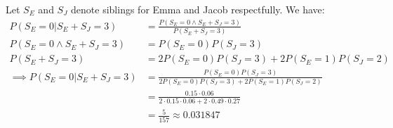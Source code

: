 \documentclass[10pt, a4paper, english]{../Template/NTNUoving}
\begin{document}
\begin{oppgave}
    \begin{punkt}
        Let $S_E$ and $S_J$ denote siblings for Emma and Jacob respectfully. We have:
        \begin{align*}
            P(S_E = 0 | S_E + S_J = 3)
            &= \frac{P(S_E = 0 \wedge S_E + S_J = 3)}{P(S_E + S_J = 3)} \\
            P(S_E = 0 \wedge S_E + S_J = 3) &= P(S_E = 0)P(S_J = 3) \\
            P(S_E + S_J = 3) &= 2 P(S_E = 0)P(S_J = 3) + 2 P(S_E = 1)P(S_J = 2) \\
            \implies P(S_E = 0 | S_E + S_J = 3) &= \frac{P(S_E = 0)P(S_J = 3)}{2 P(S_E = 0)P(S_J = 3) + 2 P(S_E = 1)P(S_J = 2)} \\
            &= \frac{0.15\cdot0.06}{2\cdot0.15\cdot0.06 + 2\cdot0.49\cdot0.27} \\
            &= \frac{5}{157} \approx 0.031847
        \end{align*}
    \end{punkt}
\end{oppgave}
\end{document}

